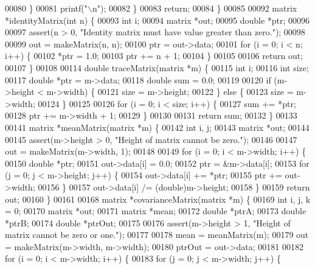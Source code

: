 \begin{DoxyCode}
{{{00080     \}
00081     printf(\textcolor{stringliteral}{"\(\backslash\)n"});
00082   \}
00083   \textcolor{keywordflow}{return};
00084 \}
00085 
00092 matrix *identityMatrix(\textcolor{keywordtype}{int} n) \{
00093   \textcolor{keywordtype}{int} i;
00094   matrix *out;
00095   \textcolor{keywordtype}{double} *ptr;
00096 
00097   assert(n > 0, \textcolor{stringliteral}{"Identity matrix must have value greater than zero."});
00098 
00099   out = makeMatrix(n, n);
00100   ptr = out->data;
00101   \textcolor{keywordflow}{for} (i = 0; i < n; i++) \{
00102     *ptr = 1.0;
00103     ptr += n + 1;
00104   \}
00105 
00106   \textcolor{keywordflow}{return} out;
00107 \}
00108 
00114 \textcolor{keywordtype}{double} traceMatrix(matrix *m) \{
00115   \textcolor{keywordtype}{int} i;
00116   \textcolor{keywordtype}{int} size;
00117   \textcolor{keywordtype}{double} *ptr = m->data;
00118   \textcolor{keywordtype}{double} sum = 0.0;
00119 
00120   \textcolor{keywordflow}{if} (m->height < m->width) \{
00121     size = m->height;
00122   \} \textcolor{keywordflow}{else} \{
00123     size = m->width;
00124   \}
00125 
00126   \textcolor{keywordflow}{for} (i = 0; i < size; i++) \{
00127     sum += *ptr;
00128     ptr += m->width + 1;
00129   \}
00130 
00131   \textcolor{keywordflow}{return} sum;
00132 \}
00133 
00141 matrix *meanMatrix(matrix *m) \{
00142   \textcolor{keywordtype}{int} i, j;
00143   matrix *out;
00144 
00145   assert(m->height > 0, \textcolor{stringliteral}{"Height of matrix cannot be zero."});
00146 
00147   out = makeMatrix(m->width, 1);
00148 
00149   \textcolor{keywordflow}{for} (i = 0; i < m->width; i++) \{
00150     \textcolor{keywordtype}{double} *ptr;
00151     out->data[i] = 0.0;
00152     ptr = &m->data[i];
00153     \textcolor{keywordflow}{for} (j = 0; j < m->height; j++) \{
00154       out->data[i] += *ptr;
00155       ptr += out->width;
00156     \}
00157     out->data[i] /= (double)m->height;
00158   \}
00159   \textcolor{keywordflow}{return} out;
00160 \}
00161 
00168 matrix *covarianceMatrix(matrix *m) \{
00169   \textcolor{keywordtype}{int} i, j, k = 0;
00170   matrix *out;
00171   matrix *mean;
00172   \textcolor{keywordtype}{double} *ptrA;
00173   \textcolor{keywordtype}{double} *ptrB;
00174   \textcolor{keywordtype}{double} *ptrOut;
00175 
00176   assert(m->height > 1, \textcolor{stringliteral}{"Height of matrix cannot be zero or one."});
00177 
00178   mean = meanMatrix(m);
00179   out = makeMatrix(m->width, m->width);
00180   ptrOut = out->data;
00181 
00182   \textcolor{keywordflow}{for} (i = 0; i < m->width; i++) \{
00183     \textcolor{keywordflow}{for} (j = 0; j < m->width; j++) \{
}}}
\end{DoxyCode}
